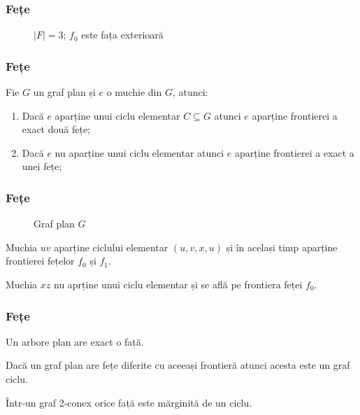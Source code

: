 \begin{frame}
  \frametitle{Fețe}

\begin{figure}
\centering%
\caption{$|F|=3$; $f_0$ este fața exterioară}
\end{figure}

\end{frame}

\begin{frame}
  \frametitle{Fețe}

\begin{theorem}
Fie $G$ un graf plan și $e$ o muchie din $G$, atunci:
\begin{enumerate}
  \item Dacă $e$ aparține unui ciclu elementar $C\subseteq G$ atunci $e$ aparține frontierei a exact două fețe;
  \item Dacă $e$ nu aparține unui ciclu elementar atunci $e$ aparține frontierei a exact a unei fețe;
\end{enumerate}

\end{theorem}
\end{frame}

\begin{frame}
  \frametitle{Fețe}

\begin{figure}
\centering%
\caption{Graf plan $G$}
\end{figure}

Muchia $uv$ aparține ciclului elementar $(u,v,x,u)$ și în același timp aparține frontierei fețelor $f_0$ și $f_1$.

Muchia $xz$ nu aprține unui ciclu elementar și se află pe frontiera feței $f_0$.

\end{frame}

\begin{frame}
  \frametitle{Fețe}

\begin{corollary}
Un arbore plan are exact o față.
\end{corollary}

\begin{corollary}
Dacă un graf plan are fețe diferite cu aceeași frontieră atunci acesta este un graf ciclu.
\end{corollary}

\begin{corollary}
Într-un graf 2-conex orice față este mărginită de un ciclu.
\end{corollary}

\end{frame}

